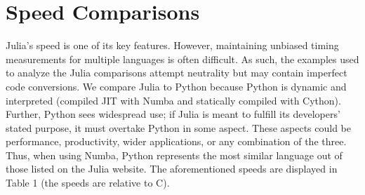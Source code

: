 \documentclass[12pt]{article}
\begin{document}
\section{Speed Comparisons}

Julia's speed is one of its key features. However, maintaining unbiased timing measurements for multiple languages is often difficult. As such, the examples used to analyze the Julia comparisons attempt neutrality but may contain imperfect code conversions. We compare Julia to Python because Python is dynamic and interpreted (compiled JIT with Numba and statically compiled with Cython). Further, Python sees widespread use; if Julia is meant to fulfill its developers' stated purpose, it must overtake Python in some aspect. These aspects could be performance, productivity, wider applications, or any combination of the three. Thus, when using Numba, Python represents the most similar language out of those listed on the Julia website. The aforementioned speeds are displayed in Table 1 (the speeds are relative to C)\cite{juliamicbench}.
\end{document}
